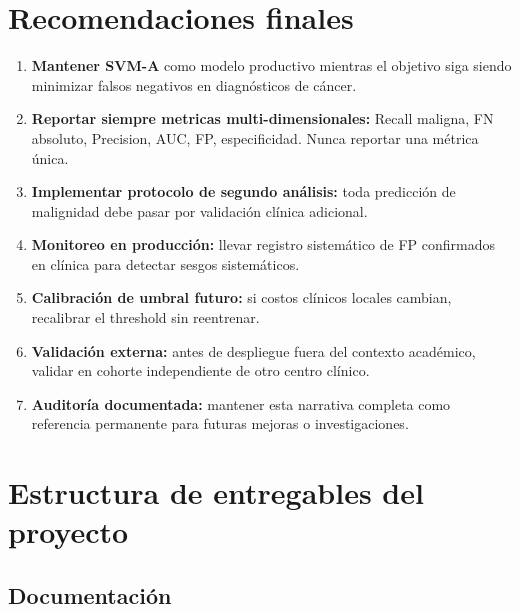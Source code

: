 \documentclass[11pt,a4paper]{article}
\begin{document}
\section{Recomendaciones finales}

\begin{enumerate}[leftmargin=1.4cm]
\item \textbf{Mantener SVM-A} como modelo productivo mientras el objetivo siga siendo minimizar falsos negativos en diagnósticos de cáncer.

\item \textbf{Reportar siempre metricas multi-dimensionales:} Recall maligna, FN absoluto, Precision, AUC, FP, especificidad. Nunca reportar una métrica única.

\item \textbf{Implementar protocolo de segundo análisis:} toda predicción de malignidad debe pasar por validación clínica adicional.

\item \textbf{Monitoreo en producción:} llevar registro sistemático de FP confirmados en clínica para detectar sesgos sistemáticos.

\item \textbf{Calibración de umbral futuro:} si costos clínicos locales cambian, recalibrar el threshold sin reentrenar.

\item \textbf{Validación externa:} antes de despliegue fuera del contexto académico, validar en cohorte independiente de otro centro clínico.

\item \textbf{Auditoría documentada:} mantener esta narrativa completa como referencia permanente para futuras mejoras o investigaciones.
\end{enumerate}

\section{Estructura de entregables del proyecto}

\subsection{Documentación}
\end{document}
